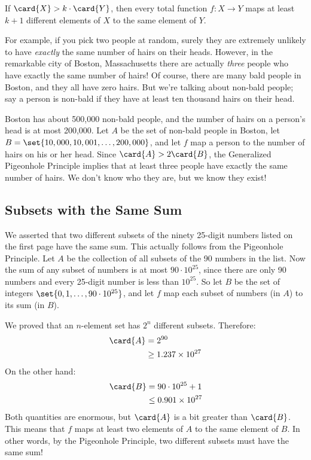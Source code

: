 \begin{mathrule}
  If $\card{X} > k \cdot \card{Y}$, then every total function $f : X \to
  Y$ maps at least $k+1$ different elements of $X$ to the same element of
  $Y$.
\end{mathrule}

For example, if you pick two people at random, surely they are extremely
unlikely to have \emph{exactly} the same number of hairs on their heads.
However, in the remarkable city of Boston, Massachusetts there are
actually \emph{three} people who have exactly the same number of hairs!
Of course, there are many bald people in Boston, and they all have zero
hairs.  But we're talking about non-bald people; say a person is non-bald
if they have at least ten thousand hairs on their head.

Boston has about 500,000 non-bald people, and the number of hairs on a
person's head is at most 200,000.  Let $A$ be the set of non-bald people
in Boston, let $B = \set{10,000, 10,001, \dots, 200,000}$, and let $f$ map
a person to the number of hairs on his or her head.  Since $\card{A} > 2
\card{B}$, the Generalized Pigeonhole Principle implies that at least
three people have exactly the same number of hairs.  We don't know who
they are, but we know they exist!

\subsection{Subsets with the Same Sum}

We asserted that two different subsets of the ninety 25-digit numbers
listed on the first page have the same sum.  This actually follows
from the Pigeonhole Principle.  Let $A$ be the collection of all
subsets of the 90 numbers in the list.  Now the sum of any subset of
numbers is at most $90 \cdot 10^{25}$, since there are only 90 numbers
and every 25-digit number is less than $10^{25}$.  So let $B$ be the
set of integers $\set{0, 1, \ldots, 90 \cdot 10^{25}}$, and let $f$
map each subset of numbers (in $A$) to its sum (in $B$).

We proved that an $n$-element set has $2^n$ different subsets.
Therefore:
%
\begin{align*}
\card{A}
    & = 2^{90} \\
    & \geq 1.237 \times 10^{27}
\end{align*}
%
On the other hand:
%
\begin{align*}
\card{B}
    & = 90 \cdot 10^{25} + 1 \\
    & \leq 0.901 \times 10^{27}
\end{align*}
%
Both quantities are enormous, but $\card{A}$ is a bit greater than
$\card{B}$.  This means that $f$ maps at least two elements of $A$ to
the same element of $B$.  In other words, by the Pigeonhole Principle,
two different subsets must have the same sum!


